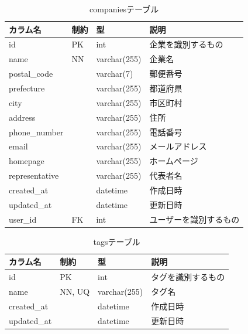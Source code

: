 \begin{table}[H]
  \centering
  \caption{companiesテーブル}
  \label{tab:db-companies}
  \begin{tabular}{|l|l|l|l|} \hline
    カラム名           & 制約 & 型            & 説明          \\ \hline \hline
    id             & PK & int          & 企業を識別するもの   \\ \hline
    name           & NN & varchar(255) & 企業名         \\ \hline
    postal\_code   &    & varchar(7)   & 郵便番号        \\ \hline
    prefecture     &    & varchar(255) & 都道府県        \\ \hline
    city           &    & varchar(255) & 市区町村        \\ \hline
    address        &    & varchar(255) & 住所          \\ \hline
    phone\_number  &    & varchar(255) & 電話番号        \\ \hline
    email          &    & varchar(255) & メールアドレス     \\ \hline
    homepage       &    & varchar(255) & ホームページ      \\ \hline
    representative &    & varchar(255) & 代表者名        \\ \hline
    created\_at    &    & datetime     & 作成日時        \\ \hline
    updated\_at    &    & datetime     & 更新日時        \\ \hline
    user\_id       & FK & int          & ユーザーを識別するもの \\ \hline
  \end{tabular}
\end{table}

\begin{table}[H]
  \centering
  \caption{tagsテーブル}
  \label{tab:db-tags}
  \begin{tabular}{|l|l|l|l|} \hline
    カラム名        & 制約     & 型            & 説明        \\ \hline \hline
    id          & PK     & int          & タグを識別するもの \\ \hline
    name        & NN, UQ & varchar(255) & タグ名       \\ \hline
    created\_at &        & datetime     & 作成日時      \\ \hline
    updated\_at &        & datetime     & 更新日時      \\ \hline
  \end{tabular}
\end{table}

